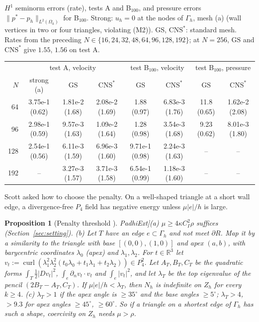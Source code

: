 \documentclass[5p,times]{elsarticle}
\newtheorem{proposition}[theorem]{Proposition}
\theoremstyle{definition}
\newcommand{\R}{\mathbb R}
\newcommand{\Gh}{\Gamma_h}
\newcommand{\Oh}{\Omega_h}
\newcommand{\Zh}{Z_h}
\newcommand{\dn}{\partial_n}
\newcommand{\norm}[1]{\lVert #1\rVert}
\newcommand{\GS}{\mathrm{GS}}
\newcommand{\CNS}{\mathrm{CNS}^\ast}
\newcommand{\curl}{\operatorname{curl}}
\newcommand{\ext}[1]{\cite[#1]{PadhiExt}}
\begin{document}
\begin{\tabenv}[!tb]
\centering\footnotesize\setlength{\tabcolsep}{3pt}
\caption{$H^1$ seminorm errors (rate), tests A and B$_{100}$, and pressure errors $\norm{p^\ast-p_h}_{L^2(\Oh)}$ for B$_{100}$. Strong: $u_h=0$ at the nodes of $\Gh$, mesh (a) (wall vertices in two or four triangles, violating (M2)). $\GS$, $\CNS$: standard mesh. Rates from the preceding $N\in\{16,24,32,48,64,96,128,192\}$; at $N=256$, $\GS$ and $\CNS$ give $1.55$, $1.56$ on test A.}\label{tab:rates}
\begin{tabular}{rccccccc}
\toprule
 & \multicolumn{3}{c}{test A, velocity} & \multicolumn{2}{c}{test B$_{100}$, velocity} & \multicolumn{2}{c}{test B$_{100}$, pressure}\\
\cmidrule(lr){2-4}\cmidrule(lr){5-6}\cmidrule(lr){7-8}
$N$ & strong (a) & $\GS$ & $\CNS$ & $\GS$ & $\CNS$ & $\GS$ & $\CNS$\\
\midrule
64 & 3.75e-1 (0.62) & 1.81e-2 (1.68) & 2.08e-2 (1.69) & 1.88 (0.97) & 6.83e-3 (1.76) & 11.8 (0.65) & 1.62e-2 (2.08)\\
96 & 2.98e-1 (0.59) & 9.57e-3 (1.63) & 1.09e-2 (1.64) & 1.28 (0.98) & 3.54e-3 (1.68) & 9.23 (0.62) & 8.01e-3 (1.80)\\
128 & 2.54e-1 (0.56) & 6.11e-3 (1.59) & 6.96e-3 (1.60) & 9.71e-1 (0.98) & 2.24e-3 (1.63) & -- & --\\
192 & -- & 3.27e-3 (1.57) & 3.71e-3 (1.58) & 6.54e-1 (0.99) & 1.18e-3 (1.60) & -- & --\\
\bottomrule
\end{tabular}
\end{\tabenv}

Scott asked how to choose the penalty. On a well-shaped triangle at a short wall edge, a divergence-free $P_4$ field has negative energy unless $\mu|e|/h$ is large.

\begin{proposition}[Penalty threshold \ext{\S10}]\label{prop:penalty}
(a) $\mu\ge4\kappa C_I^2\rho$ suffices (Section~\ref{sec:setting}). (b) Let $T$ have an edge $e\subset\Gh$ and not meet $\partial R$. Map it by a similarity to the triangle with base $[(0,0),(1,0)]$ and apex $(a,b)$, with barycentric coordinates $\lambda_0$ (apex) and $\lambda_1,\lambda_2$. For $t\in\R^3$ let $v_t:=\curl(\lambda_1^2\lambda_2^2(t_0\lambda_0+t_1\lambda_1+t_2\lambda_2))\in P_4^2$. Let $A_T,B_T,C_T$ be the quadratic forms $\int_T\frac12|Dv_t|^2$, $\int_e\dn v_t\cdot v_t$ and $\int_e|v_t|^2$, and let $\lambda_T$ be the top eigenvalue of the pencil $(2B_T-A_T,C_T)$. If $\mu|e|/h<\lambda_T$, then $N_h$ is indefinite on $\Zh$ for every $k\ge4$. (c) $\lambda_T>1$ if the apex angle is $\ge35^\circ$ and the base angles $\ge5^\circ$; $\lambda_T>4$, $>9.3$ for apex angles $\ge45^\circ$, $\ge60^\circ$. So if a triangle on a shortest edge of $\Gh$ has such a shape, coercivity on $\Zh$ needs $\mu>\rho$.
\end{proposition}
\end{document}
